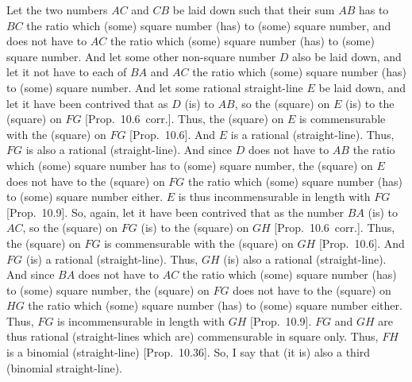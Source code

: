 \begin{Parallel}{}{}
{Let the two numbers $AC$ and $CB$ be laid down such that their sum
$AB$ has to $BC$ the ratio which (some) square number (has) to
(some) square number, and does not have to $AC$ the ratio which (some)
square number (has) to (some) square number. And let some other non-square number
$D$ also be laid down, and let it not have to each of $BA$ and $AC$ the
ratio which (some) square number (has) to (some) square number.
And let some rational straight-line $E$ be laid down, and let it have been
contrived that as $D$ (is) to $AB$, so the (square) on $E$ (is) to
the (square) on $FG$ [Prop.~10.6~corr.]. Thus,
the (square) on $E$ is commensurable with the (square) on $FG$ [Prop.~10.6]. And $E$ is a rational (straight-line).
Thus, $FG$ is also a rational (straight-line). And since $D$ does not have to
$AB$ the ratio which (some) square number has to (some) square number,
the (square) on $E$ does not have to the (square) on $FG$ the ratio
which (some) square number (has) to (some) square number either.
$E$ is thus incommensurable in length with $FG$ [Prop.~10.9]. So, again, let it have been contrived that
as the number $BA$ (is) to $AC$, so the (square) on  $FG$ (is) to the
(square) on $GH$ [Prop.~10.6~corr.]. Thus,
the (square) on $FG$ is commensurable with the (square) on $GH$
[Prop.~10.6]. And $FG$ (is) a rational (straight-line).
Thus, $GH$ (is) also a rational (straight-line). And since $BA$ does not have to $AC$ the ratio which (some) square number (has) to (some) square number, the (square) on $FG$  does not have to the (square) on $HG$
the ratio which (some) square number (has) to (some) square number either.
Thus, $FG$ is incommensurable in length with $GH$ [Prop.~10.9].  $FG$ and $GH$ are thus rational
(straight-lines which are) commensurable in square only. Thus,
$FH$ is a binomial (straight-line) [Prop.~10.36].
So, I say that (it is) also a third (binomial straight-line).

}
\end{Parallel}
